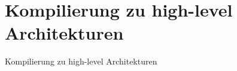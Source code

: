 \section{Kompilierung zu high-level Architekturen}
\begin{frame}{Kompilierung zu high-level Architekturen}
\end{frame}
